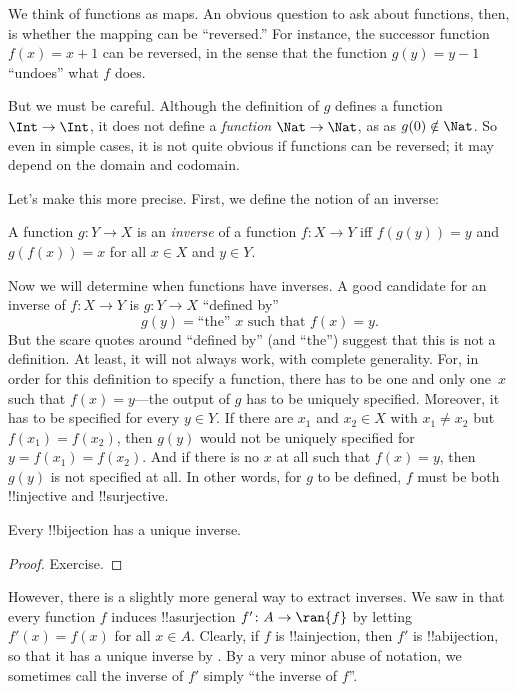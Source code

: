 \documentclass[../../../include/open-logic-section]{subfiles}
\begin{document}

\begin{explain}
We think of functions as maps. An obvious question to ask about functions, then, is whether the mapping can be
``reversed.'' For instance, the successor function $f(x) = x + 1$ can
be reversed, in the sense that the function $g(y) = y - 1$ ``undoes''
what $f$ does. 

But we must be careful. Although the definition of $g$
defines a function $\Int \to \Int$, it does not define a \emph{function}
$\Nat \to \Nat$, as as $g(0) \notin \Nat$.  So even in simple cases, it is
not quite obvious if functions can be reversed; it may depend
on the domain and codomain.  

Let's make this more precise. First, we define the notion of an inverse:
\end{explain}

\begin{defn}
A function $g \colon Y \to X$ is an \emph{inverse} of a function $f
\colon X \to Y$ iff $f(g(y)) = y$ and $g(f(x)) = x$ for all $x \in X$
and $y \in Y$.
\end{defn}
\begin{explain}
Now we will determine when functions have inverses. A good candidate for an inverse of
$f\colon X \to Y$ is $g\colon Y \to X$ ``defined by''
\[
g(y) = \text{``the'' $x$ such that $f(x) = y$.}
\]
But the scare quotes around ``defined by'' (and ``the'') suggest that this is not a
definition.  At least, it will not always work, with complete generality. For, in order for this
definition to specify a function, there has to be one and only one~$x$
such that $f(x) = y$---the output of $g$ has to be uniquely specified.
Moreover, it has to be specified for every $y \in Y$.  If there are
$x_1$ and $x_2 \in X$ with $x_1 \neq x_2$ but $f(x_1) = f(x_2)$, then
$g(y)$ would not be uniquely specified for $y = f(x_1) = f(x_2)$. And
if there is no $x$ at all such that $f(x) = y$, then $g(y)$ is not
specified at all.  In other words, for $g$ to be defined, $f$ must be both !!{injective} and !!{surjective}.
\end{explain}
\begin{prop}
	Every !!{bijection} has a unique inverse.
\end{prop}
\begin{proof}
Exercise.
\end{proof}
\begin{explain}
	However, there is a slightly more general way to extract inverses. We saw in  that every function $f$ induces !!a{surjection} $f' \colon A \to \ran{f}$ by letting $f'(x) = f(x)$ for all $x \in A$. Clearly, if $f$ is !!a{injection}, then $f'$ is !!a{bijection}, so that it has a unique inverse by . By a very minor abuse of notation, we sometimes call the inverse of $f'$ simply ``the inverse of $f$''.
\end{explain}
\end{document}
